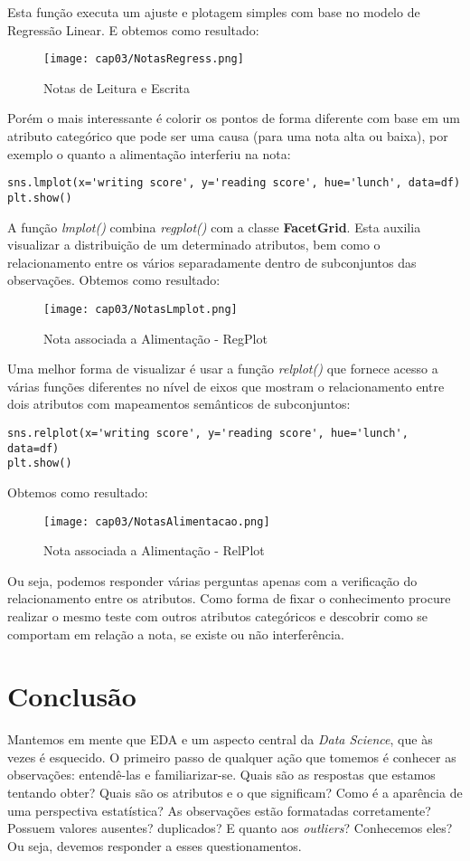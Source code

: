 Esta função executa um ajuste e plotagem simples com base no modelo de Regressão Linear. E obtemos como resultado:
\begin{figure}[H]
	\centering
	\texttt{[image: cap03/NotasRegress.png]}
	\caption{Notas de Leitura e Escrita}
\end{figure}

Porém o mais interessante é colorir os pontos de forma diferente com base em um atributo categórico que pode ser uma causa (para uma nota alta ou baixa), por exemplo o quanto a alimentação interferiu na nota:
\begin{lstlisting}[]
sns.lmplot(x='writing score', y='reading score', hue='lunch', data=df)
plt.show()
\end{lstlisting}

A função \textit{lmplot()} combina \textit{regplot()} com a classe \textbf{FacetGrid}. Esta auxilia visualizar a distribuição de um determinado atributos, bem como o relacionamento entre os vários separadamente dentro de subconjuntos das observações. Obtemos como resultado:
\begin{figure}[H]
	\centering
	\texttt{[image: cap03/NotasLmplot.png]}
	\caption{Nota associada a Alimentação - RegPlot}
\end{figure}

Uma melhor forma de visualizar é usar a função \textit{relplot()} que fornece acesso a várias funções diferentes no nível de eixos que mostram o relacionamento entre dois atributos com mapeamentos semânticos de subconjuntos:
\begin{lstlisting}[]
sns.relplot(x='writing score', y='reading score', hue='lunch', data=df)
plt.show()
\end{lstlisting}

Obtemos como resultado:
\begin{figure}[H]
	\centering
	\texttt{[image: cap03/NotasAlimentacao.png]}
	\caption{Nota associada a Alimentação - RelPlot}
\end{figure}

Ou seja, podemos responder várias perguntas apenas com a verificação do relacionamento entre os atributos. Como forma de fixar o conhecimento procure realizar o mesmo teste com outros atributos categóricos e descobrir como se comportam em relação a nota, se existe ou não interferência.

\section{Conclusão}
Mantemos em mente que EDA e um aspecto central da \textit{Data Science}, que às vezes é esquecido. O primeiro passo de qualquer ação que tomemos é conhecer as observações: entendê-las e familiarizar-se. Quais são as respostas que estamos tentando obter? Quais são os atributos e o que significam? Como é a aparência de uma perspectiva estatística? As observações estão formatadas corretamente? Possuem valores ausentes? duplicados? E quanto aos \textit{outliers}? Conhecemos eles? Ou seja, devemos responder a esses questionamentos.

